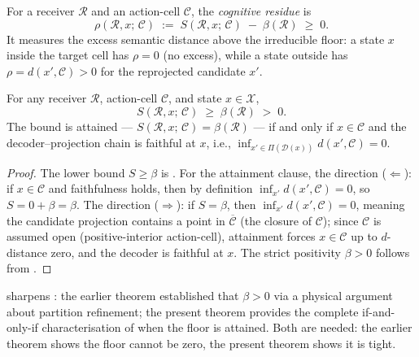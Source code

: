 \begin{definition}
\label{def:cognitive-residue}
For a receiver $\mathcal{R}$ and an action-cell $\mathcal{C}$, the
\emph{cognitive residue} is
\[
  \rho(\mathcal{R}, x;\, \mathcal{C})
  \;:=\; S(\mathcal{R}, x;\, \mathcal{C}) \;-\; \beta(\mathcal{R})
  \;\geq\; 0 .
\]
It measures the excess semantic distance above the irreducible floor: a state
$x$ inside the target cell has $\rho = 0$ (no excess), while a state outside
has $\rho = d(x', \mathcal{C}) > 0$ for the reprojected candidate $x'$.
\end{definition}

\begin{theorem}
\label{thm:floor-receiver-full}
For any receiver $\mathcal{R}$, action-cell $\mathcal{C}$, and state
$x \in \mathcal{X}$,
\[
  S(\mathcal{R}, x;\, \mathcal{C}) \;\geq\; \beta(\mathcal{R}) \;>\; 0 .
\]
The bound is attained — $S(\mathcal{R}, x;\, \mathcal{C}) = \beta(\mathcal{R})$
— if and only if $x \in \mathcal{C}$ and the decoder--projection chain is
faithful at $x$, i.e., $\inf_{x' \in \Pi(\mathcal{D}(x))} d(x', \mathcal{C})
= 0$.
\end{theorem}

\begin{proof}
The lower bound $S \geq \beta$ is .  For the attainment clause,
the direction ($\Leftarrow$): if $x \in \mathcal{C}$ and faithfulness holds,
then by definition $\inf_{x'} d(x', \mathcal{C}) = 0$, so $S = 0 + \beta =
\beta$.  The direction ($\Rightarrow$): if $S = \beta$, then $\inf_{x'}
d(x', \mathcal{C}) = 0$, meaning the candidate projection contains a point in
$\overline{\mathcal{C}}$ (the closure of $\mathcal{C}$); since $\mathcal{C}$
is assumed open (positive-interior action-cell), attainment forces $x \in
\mathcal{C}$ up to $d$-distance zero, and the decoder is faithful at $x$.
The strict positivity $\beta > 0$ follows from .
\end{proof}

\begin{remark}
 sharpens : the
earlier theorem established that $\beta > 0$ via a physical argument about
partition refinement; the present theorem provides the complete if-and-only-if
characterisation of when the floor is attained.  Both are needed: the earlier
theorem shows the floor cannot be zero, the present theorem shows it is tight.
\end{remark}

